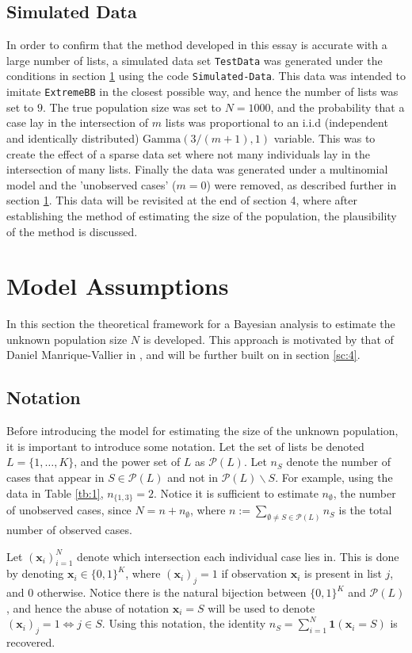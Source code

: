 \documentclass[10pt,a4paper,notitlepage]{article}
\newcommand{\x}{\textbf{x}}
\begin{document}
\subsection{Simulated Data}
In order to confirm that the method developed in this essay is accurate with a large number of lists, a simulated data set \texttt{TestData} was generated under the conditions in section \ref{sc:3} using the code \texttt{Simulated-Data}. This data was intended to imitate \texttt{ExtremeBB} in the closest possible way, and hence the number of lists was set to $9$. The true population size was set to $N=1000$, and the probability that a case lay in the intersection of $m$ lists was proportional to an i.i.d (independent and identically distributed) $\text{Gamma}(3/(m+1),1)$ variable. This was to create the effect of a sparse data set where not many individuals lay in the intersection of many lists. Finally the data was generated under a multinomial model and the 'unobserved cases' ($m=0$) were removed, as described further in section \ref{sc:3}. This data will be revisited at the end of section 4, where after establishing the method of estimating the size of the population, the plausibility of the method is discussed.

\section{Model Assumptions}\label{sc:3}
In this section the theoretical framework for a Bayesian analysis to estimate the unknown population size $N$ is developed. This approach is motivated by that of Daniel Manrique-Vallier in \cite{BayesianMixing}, and will be further built on in section \ref{sc:4}.
\subsection{Notation}
Before introducing the model for estimating the size of the unknown population, it is important to introduce some notation. Let the set of lists be denoted $L=\{1,\hdots,K\}$, and the power set of $L$ as $\mathcal{P}(L)$. Let $n_{S}$ denote the number of cases that appear in $S\in\mathcal{P}(L)$ and not in $\mathcal{P}(L)\backslash S$. For example, using the data in Table \ref{tb:1}, $n_{\{1,3\}}=2$. Notice it is sufficient to estimate $n_{\emptyset}$, the number of unobserved cases, since $N=n+n_{\emptyset}$, where $n:=\sum_{\emptyset \neq S\in \mathcal{P}(L)}n_{S}$ is the total number of observed cases.

Let $\left(\x_{i}\right)_{i=1}^{N}$ denote which intersection each individual case lies in. This is done by denoting $\x_{i}\in\{0,1\}^{K}$, where $(\x_{i})_{j}=1$ if observation $\x_{i}$ is present in list $j$, and 0 otherwise. Notice there is the natural bijection between $\{0,1\}^{K}$ and $\mathcal{P}(L)$, and hence the abuse of notation $\x_{i}=S$ will be used to denote $(\x_{i})_{j}=1\iff j\in S$. Using this notation, the identity $n_{S}=\sum_{i=1}^{N}\mathbf{1}(\x_{i}=S)$ is recovered.
\end{document}
